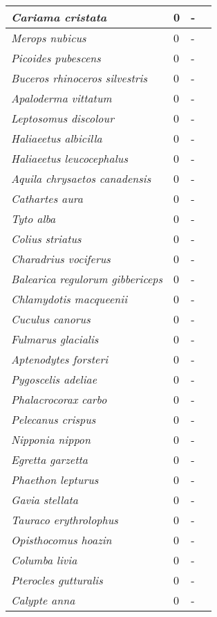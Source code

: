 {\begin{longtable}{| L{4cm} | L{2cm}  | L{5cm} | L{4cm} |}
\textit{Cariama cristata} & 0 & - & \\ \hline
\textit{Merops nubicus} & 0 & - & \\ \hline
\textit{Picoides pubescens} & 0 & - & \\ \hline
\textit{Buceros rhinoceros silvestris} & 0 & - & \\ \hline
\textit{Apaloderma vittatum} & 0 & - & \\ \hline
\textit{Leptosomus discolour} & 0 & - & \\ \hline
\textit{Haliaeetus albicilla} & 0 & - & \\ \hline
\textit{Haliaeetus leucocephalus} & 0 & - & \\ \hline
\textit{Aquila chrysaetos canadensis} & 0 & - & \\ \hline
\textit{Cathartes aura} & 0 & - & \\ \hline
\textit{Tyto alba} & 0 & - & \\ \hline
\textit{Colius striatus} & 0 & - & \\ \hline
\textit{Charadrius vociferus} & 0 & - & \\ \hline
\textit{Balearica regulorum gibbericeps} & 0 & - & \\ \hline
\textit{Chlamydotis macqueenii} & 0 & - & \\ \hline
\textit{Cuculus canorus} & 0 & - & \\ \hline
\textit{Fulmarus glacialis} & 0 & - & \\ \hline
\textit{Aptenodytes forsteri} & 0 & - & \\ \hline
\textit{Pygoscelis adeliae} & 0 & - & \\ \hline
\textit{Phalacrocorax carbo} & 0 & - & \\ \hline
\textit{Pelecanus crispus} & 0 & - & \\ \hline
\textit{Nipponia nippon} & 0 & - & \\ \hline
\textit{Egretta garzetta} & 0 & - & \\ \hline
\textit{Phaethon lepturus} & 0 & - & \\ \hline
\textit{Gavia stellata} & 0 & - & \\ \hline
\textit{Tauraco erythrolophus} & 0 & - & \\ \hline
\textit{Opisthocomus hoazin} & 0 & - & \\ \hline
\textit{Columba livia} & 0 & - & \\ \hline
\textit{Pterocles gutturalis} & 0 & - & \\ \hline
\textit{Calypte anna} & 0 & - & \\ \hline

\end{longtable}}
